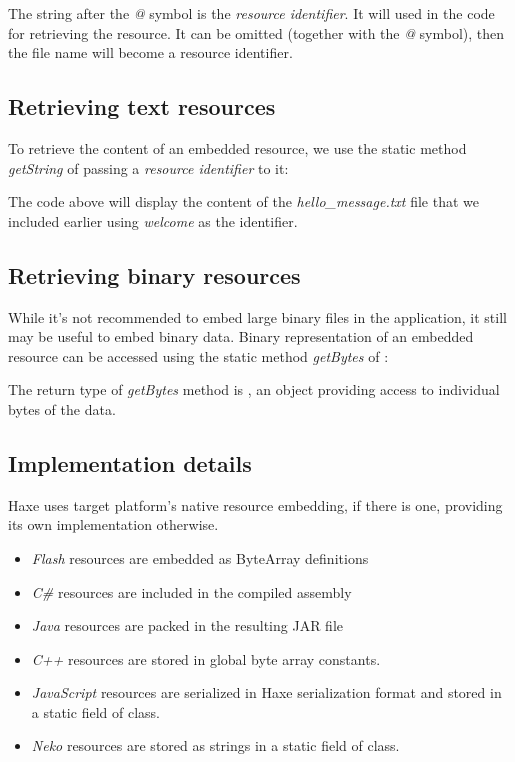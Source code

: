 \documentclass{haxe}
\begin{document}
The string after the \emph{@} symbol is the \emph{resource identifier}. It will used in the code for retrieving the resource. It can be omitted (together with the \emph{@} symbol), then the file name will become a resource identifier.

\subsection{Retrieving text resources}
\label{cr-resources-getString}

To retrieve the content of an embedded resource, we use the static method \emph{getString} of  passing a \emph{resource identifier} to it:


The code above will display the content of the \emph{hello_message.txt} file that we included earlier using \emph{welcome} as the identifier.

\subsection{Retrieving binary resources}
\label{cr-resources-getBytes}

While it's not recommended to embed large binary files in the application, it still may be useful to embed binary data. Binary representation of an embedded resource can be accessed using the static method \emph{getBytes} of :


The return type of \emph{getBytes} method is , an object providing access to individual bytes of the data.

\subsection{Implementation details}
\label{cr-resources-impl}

Haxe uses target platform's native resource embedding, if there is one, providing its own implementation otherwise.

\begin{itemize}
\item \emph{Flash} resources are embedded as ByteArray definitions
\item \emph{C\#} resources are included in the compiled assembly
\item \emph{Java} resources are packed in the resulting JAR file
\item \emph{C++} resources are stored in global byte array constants.
\item \emph{JavaScript} resources are serialized in Haxe serialization format and stored in a static field of  class.
\item \emph{Neko} resources are stored as strings in a static field of  class.
\end{itemize}
\end{document}
